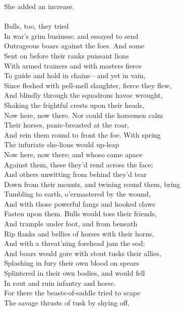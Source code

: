 She added an increase.\\
\\
Bulls, too, they tried\\
In war's grim business; and essayed to send\\
Outrageous boars against the foes. And some\\
Sent on before their ranks puissant lions\\
With armed trainers and with masters fierce\\
To guide and hold in chains—and yet in vain,\\
Since fleshed with pell-mell slaughter, fierce they flew,\\
And blindly through the squadrons havoc wrought,\\
Shaking the frightful crests upon their heads,\\
Now here, now there. Nor could the horsemen calm\\
Their horses, panic-breasted at the roar,\\
And rein them round to front the foe. With spring\\
The infuriate she-lions would up-leap\\
Now here, now there; and whoso came apace\\
Against them, these they'd rend across the face;\\
And others unwitting from behind they'd tear\\
Down from their mounts, and twining round them, bring\\
Tumbling to earth, o'ermastered by the wound,\\
And with those powerful fangs and hooked claws\\
Fasten upon them. Bulls would toss their friends,\\
And trample under foot, and from beneath\\
Rip flanks and bellies of horses with their horns,\\
And with a threat'ning forehead jam the sod;\\
And boars would gore with stout tusks their allies,\\
Splashing in fury their own blood on spears\\
Splintered in their own bodies, and would fell\\
In rout and ruin infantry and horse.\\
For there the beasts-of-saddle tried to scape\\
The savage thrusts of tusk by shying off,\\

